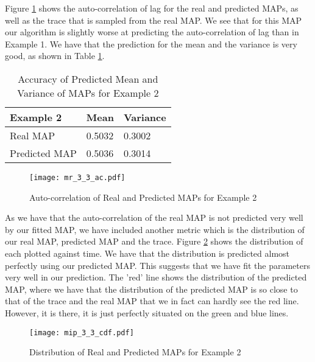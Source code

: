 \documentclass[a4paper,11pt,titlepage]{article}
\begin{document}
Figure \ref{fig:mr_3_3_ac} shows the auto-correlation of lag for the real and predicted MAPs, as well as the trace that is sampled from the real MAP. We see that for this MAP our algorithm is slightly worse at predicting the auto-correlation of lag than in Example 1. We have that the prediction for the mean and the variance is very good, as shown in Table \ref{table:ex2_mean_var}. \\

\begin{table}[h!]
\begin{center}
\begin{tabular}{|l|l|l|}
\hline
Example 2 & Mean & Variance \\ \hline
Real MAP & 0.5032 & 0.3002 \\ \hline
Predicted MAP & 0.5036 & 0.3014 \\ \hline
\end{tabular}
\caption{Accuracy of Predicted Mean and Variance of MAPs for Example 2}
\label{table:ex2_mean_var}
\end{center}
\end{table}

\begin{figure}[h!]
\begin{center}
\texttt{[image: mr\_3\_3\_ac.pdf]}
\caption{Auto-correlation of Real and Predicted MAPs for Example 2}
\label{fig:mr_3_3_ac}
\end{center}
\end{figure}

As we have that the auto-correlation of the real MAP is not predicted very well by our fitted MAP, we have included another metric which is the distribution of our real MAP, predicted MAP and the trace. Figure \ref{fig:mr_3_3_cdf} shows the distribution of each plotted against time. We have that the distribution is predicted almost perfectly using our predicted MAP. This suggests that we have fit the parameters very well in our prediction. The 'red' line shows the distribution of the predicted MAP, where we have that the distribution of the predicted MAP is so close to that of the trace and the real MAP that we in fact can hardly see the red line. However, it is there, it is just perfectly situated on the green and blue lines. 


\begin{figure}[h!]
\begin{center}
\texttt{[image: mip\_3\_3\_cdf.pdf]}
\caption{Distribution of Real and Predicted MAPs for Example 2}
\label{fig:mr_3_3_cdf}
\end{center}
\end{figure}
\end{document}
